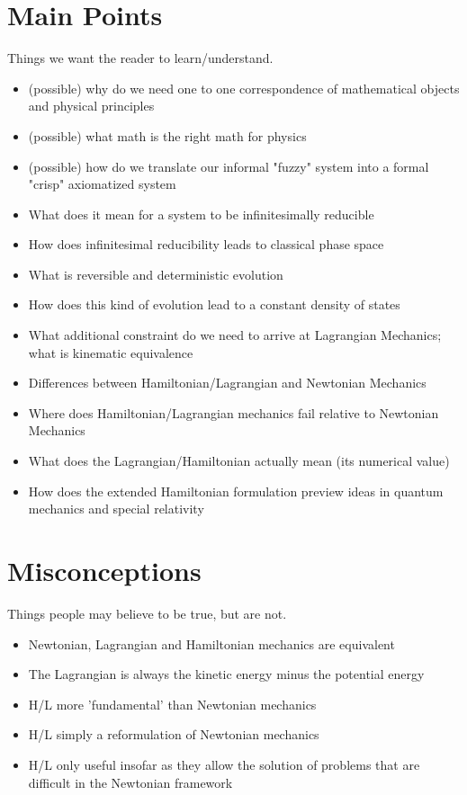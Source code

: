 \documentclass{article}
\begin{document}
\section{Main Points}
Things we want the reader to learn/understand.


\begin{itemize}

\item (possible) why do we need one to one correspondence of mathematical objects and physical principles
\item (possible) what math is the right math for physics
\item (possible) how do we translate our informal "fuzzy" system into a formal "crisp" axiomatized system

	\item What does it mean for a system to be infinitesimally reducible
	\item How does infinitesimal reducibility leads to classical phase space
	\item What is reversible and deterministic evolution
	\item How does this kind of evolution lead to a constant density of states
	\item What additional constraint do we need to arrive at Lagrangian Mechanics; what is kinematic equivalence
	\item Differences between Hamiltonian/Lagrangian and Newtonian Mechanics
	\item Where does Hamiltonian/Lagrangian mechanics fail relative to Newtonian Mechanics
	\item What does the Lagrangian/Hamiltonian actually mean (its numerical value)
	\item How does the extended Hamiltonian formulation preview ideas in quantum mechanics and special relativity
\end{itemize}


\section{Misconceptions}
Things people may believe to be true, but are not.

\begin{itemize}
	\item Newtonian, Lagrangian and Hamiltonian mechanics are equivalent
	\item The Lagrangian is always the kinetic energy minus the potential energy 
	\item H/L more 'fundamental' than Newtonian mechanics
	\item H/L simply a reformulation of Newtonian mechanics
	\item H/L only useful insofar as they allow the solution of problems that are difficult in the Newtonian framework
\end{itemize}
\end{document}
